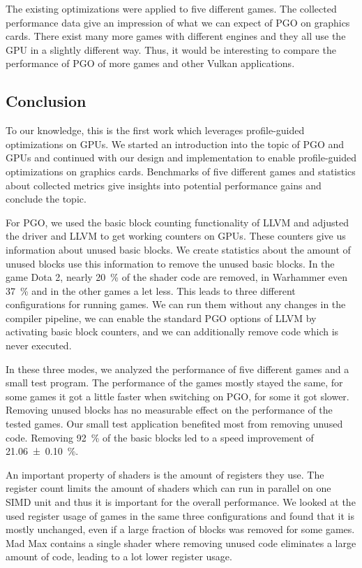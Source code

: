 The existing optimizations were applied to five different games.
The collected performance data give an impression of what we can expect of PGO on graphics cards.
There exist many more games with different engines and they all use the GPU in a slightly different way.
Thus, it would be interesting to compare the performance of PGO of more games and other Vulkan applications.

\subsection{Conclusion}
\label{sub:conclusion}
To our knowledge, this is the first work which leverages profile-guided optimizations on GPUs.
We started an introduction into the topic of PGO and GPUs and continued with our design and implementation to enable profile-guided optimizations on graphics cards.
Benchmarks of five different games and statistics about collected metrics give insights into potential performance gains and conclude the topic.

For PGO, we used the basic block counting functionality of LLVM and adjusted the driver and LLVM to get working counters on GPUs.
These counters give us information about unused basic blocks.
We create statistics about the amount of unused blocks use this information to remove the unused basic blocks.
In the game Dota 2, nearly \SI{20}{\percent} of the shader code are removed, in Warhammer even \SI{37}{\percent} and in the other games a let less.
This leads to three different configurations for running games.
We can run them without any changes in the compiler pipeline, we can enable the standard PGO options of LLVM by activating basic block counters, and we can additionally remove code which is never executed.

In these three modes, we analyzed the performance of five different games and a small test program.
The performance of the games mostly stayed the same, for some games it got a little faster when switching on PGO, for some it got slower.
Removing unused blocks has no measurable effect on the performance of the tested games.
Our small test application benefited most from removing unused code.
Removing \SI{92}{\percent} of the basic blocks led to a speed improvement of \SI{21.06 \pm 0.10}{\percent}.

An important property of shaders is the amount of registers they use.
The register count limits the amount of shaders which can run in parallel on one SIMD unit and thus it is important for the overall performance.
We looked at the used register usage of games in the same three configurations and found that it is mostly unchanged, even if a large fraction of blocks was removed for some games.
Mad Max contains a single shader where removing unused code eliminates a large amount of code, leading to a lot lower register usage.


